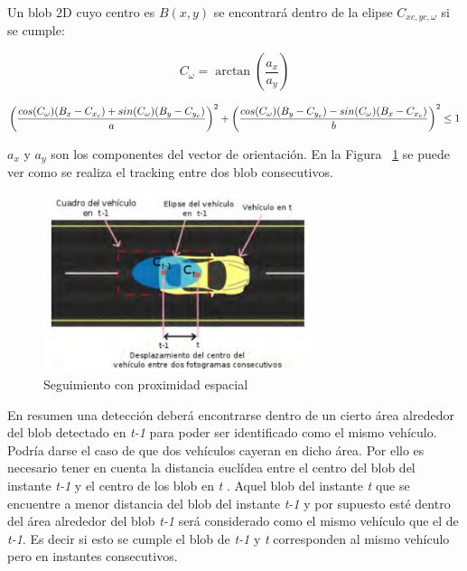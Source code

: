 Un blob 2D cuyo centro es $B(x,y)$ se encontrará dentro de la elipse  $C_{xc,yc,\omega}$ si se cumple:

\begin{equation}\label{ec.blob_elipse}
   C_{\omega} = \arctan(\frac{a_x}{a_y})
\end{equation}

\begin{equation} \scriptsize \label{ec.blob_elipse1}
   \left(\frac{cos(C_\omega)(B_x - C_{x_c}) + sin(C_\omega)(B_y - C_{y_c})}{a} \right)^2 + \left(\frac{cos(C_\omega)(B_y - C_{y_c}) - sin(C_\omega)(B_x - C_{x_c})}{b} \right)^2 \leq 1
\end{equation}

$a_x$ y $a_y$ son los componentes del vector de orientación. En la Figura ~\ref{fig.emparejamiento_blob} se puede ver como se realiza el tracking entre dos blob consecutivos. 

 \begin{figure}[H] 
\begin{center}
   \includegraphics[width=0.7\textwidth]{figures/Diseno_global/emparejamiento_blob.png}
   \caption{Seguimiento con proximidad espacial}
	\label{fig.emparejamiento_blob}
\end{center}
\end{figure}

En resumen una detección deberá encontrarse dentro de un cierto área alrededor del blob detectado en \textit{t-1} para poder ser identificado como el mismo vehículo. Podría darse el caso de que dos vehículos cayeran en dicho área. Por ello es necesario tener en cuenta la distancia euclídea entre el centro del blob del instante \textit{t-1} y el centro de los blob en \textit{t} . Aquel blob del instante \textit{t} que se encuentre a menor distancia del blob del instante \textit{t-1} y por supuesto esté dentro del área alrededor del blob \textit{t-1} será considerado como el mismo vehículo que el de \textit{
t-1}. Es decir si esto se cumple el blob de \textit{t-1} y \textit{t} corresponden al  mismo vehículo pero en instantes consecutivos.

